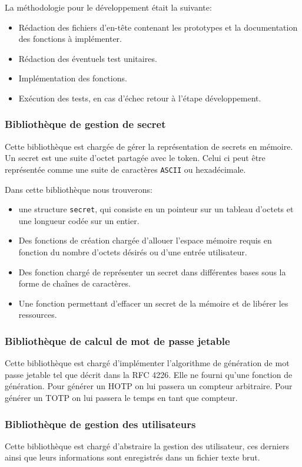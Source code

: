 La méthodologie pour le développement était la suivante:
\begin{itemize}
  \item Rédaction des fichiers d'en-tête contenant les prototypes et la
  documentation des fonctions à implémenter.
  \item Rédaction des éventuels test unitaires.
  \item Implémentation des fonctions.
  \item Exécution des tests, en cas d'échec retour à l'étape développement.
\end{itemize}

\subsubsection{Bibliothèque de gestion de secret}
Cette bibliothèque est chargée de gérer la représentation de secrets en mémoire.
Un secret est une suite d'octet partagée avec le token. Celui ci peut être
représentée comme une suite de caractères \verb?ASCII? ou hexadécimale.

Dans cette bibliothèque nous trouverons:
\begin{itemize}
  \item une structure \verb?secret?, qui consiste en un pointeur sur un tableau
  d'octets et une longueur codée sur un entier.
  \item Des fonctions de création chargée d'allouer l'espace mémoire requis en
  fonction du nombre d'octets désirés ou d'une entrée utilisateur.
  \item Des fonction chargé de représenter un secret dans différentes bases
  sous la forme de chaînes de caractères.
  \item Une fonction permettant d'effacer un secret de la mémoire et de
  libérer les ressources.
\end{itemize}

\subsubsection{Bibliothèque de calcul de mot de passe jetable}
Cette bibliothèque est chargé d'implémenter l'algorithme de génération de mot
passe jetable tel que décrit dans la RFC 4226\cite{HOTPrfc}. Elle ne fourni
qu'une fonction de génération. Pour générer un HOTP on lui passera un compteur
arbitraire. Pour générer un TOTP on lui passera le temps en tant que compteur.

\subsubsection{Bibliothèque de gestion des utilisateurs}
Cette bibliothèque est chargé d'abstraire la gestion des utilisateur, ces
derniers ainsi que leurs informations sont enregistrés dans un fichier texte
brut.

